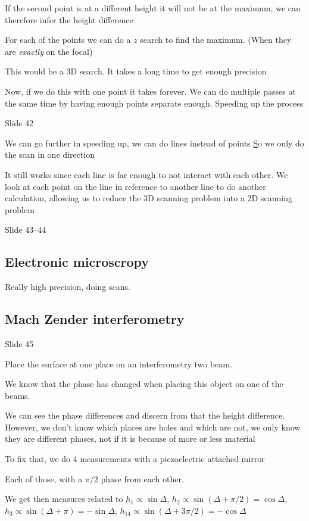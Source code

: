 \documentclass[../main/main.tex]{subfiles}
\begin{document}
If the second point is at a different height it will not be at the maximum, we can therefore infer the height difference

For each of the points we can do a $z$ search to find the maximum. (When they are \emph{exactly} on the focal)

This would be a 3D search. It takes a long time to get enough precision

Now, if we do this with one point it takes forever. We can do multiple passes at the same time by having enough points separate enough. Speeding up the process

Slide 42

We can go further in speeding up, we can do lines instead of points \href{https://www.youtube.com/watch?v=QFtZFbug1SA}

So we only do the scan in one direction

It still works since each line is far enough to not interact with each other. We look at each point on the line in reference to another line to do another calculation, allowing us to reduce the 3D scanning problem into a 2D scanning problem

Slide 43--44

\subsection{Electronic microscropy}

Really high precision, doing scans.

\subsection{Mach Zender interferometry}

Slide 45

Place the surface at one place on an interferometry two beam.

We know that the phase has changed when placing this object on one of the beams.

We can see the phase differences and discern from that the height difference. However, we don't know which places are holes and which are not, we only know they are different phases, not if it is because of more or less material

To fix that, we do 4 measurements with a piezoelectric attached mirror

Each of those, with a $\pi/2 $ phase from each other.

We get then measures related to $h_1 \propto \sin \Delta$, $h_2 \propto\sin( \Delta + \pi/2) = \cos \Delta$,  $h_3 \propto\sin( \Delta + \pi) = -\sin \Delta$,  $h_14 \propto\sin( \Delta + 3\pi/2) = -\cos \Delta$
\end{document}
